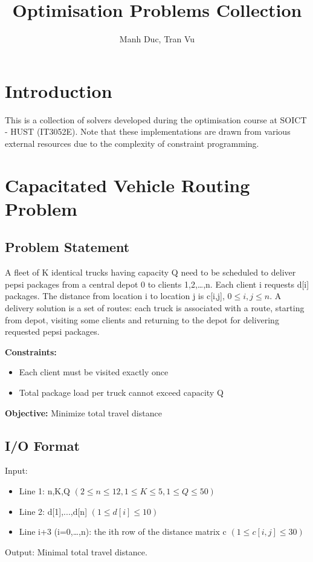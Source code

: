 \documentclass{article}
\newcommand{\subtitle}[1]{%
  \posttitle{%
    \par\end{center}
    \begin{center}\large#1\end{center}}%
}
\begin{document}
\title{Optimisation Problems Collection}
\subtitle{SOICT - HUST (IT3052E)}
\author{Manh Duc, Tran Vu}
\date{}
\maketitle
\pagebreak
\tableofcontents
\pagebreak
\section{Introduction}
This is a collection of solvers developed during the optimisation course at SOICT - HUST (IT3052E). Note that these implementations are drawn from various external resources due to the complexity of constraint programming.

\pagebreak

\section{Capacitated Vehicle Routing Problem}

\subsection{Problem Statement}
A fleet of K identical trucks having capacity Q need to be scheduled to deliver pepsi packages from a central depot 0 to clients 1,2,…,n. Each client i requests d[i] packages. The distance from location i to location j is c[i,j], $0 \leq i,j \leq n$. A delivery solution is a set of routes: each truck is associated with a route, starting from depot, visiting some clients and returning to the depot for delivering requested pepsi packages.

\textbf{Constraints:}

\begin{itemize}
    \item Each client must be visited exactly once
    \item Total package load per truck cannot exceed capacity Q
\end{itemize}

\textbf{Objective:} Minimize total travel distance

\subsection{I/O Format}
Input:
\begin{itemize}
    \item Line 1: n,K,Q $(2\le n\le 12,1\le K\le 5,1\le Q\le50)$
    \item Line 2: d[1],...,d[n] $(1\le d[i]\le 10)$
    \item Line i+3 (i=0,…,n): the ith row of the distance matrix c $(1\le c[i,j]\le 30)$
\end{itemize}
Output: Minimal total travel distance.
\end{document}
